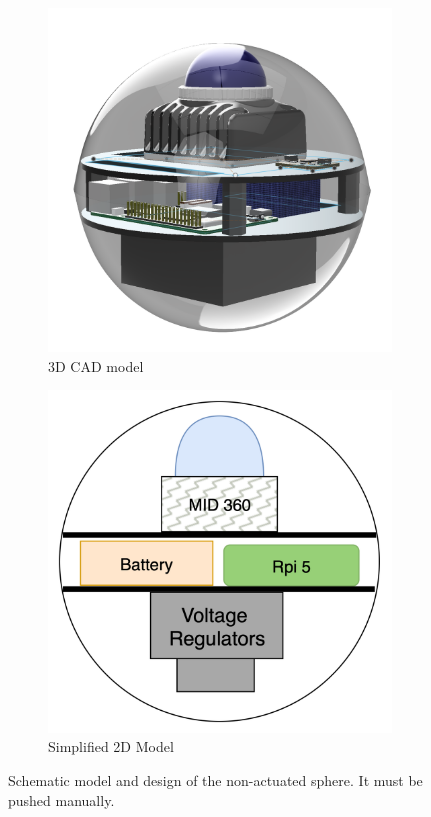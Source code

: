 \documentclass[english, bachelor, utf8]{base/thesis_telematics}
\begin{document}
\begin{figure}
\centering
\begin{subfigure}{0.4\columnwidth}
    \centering
    \includegraphics[width=\textwidth]{pics/Non_actuated_Sphere_CAD.png}
    \caption{3D CAD model}
    \label{fig:cad-model}
\end{subfigure}
\hfill
\begin{subfigure}{0.4\columnwidth}
    \centering
    \includegraphics[width=\textwidth]{pics/image.png}
    \caption{Simplified 2D Model}
    \label{fig:2d-model}
\end{subfigure}
\caption{Schematic model and design of the non-actuated sphere.
It must be pushed manually.}
\label{fig:cad-design1}
\end{figure}
\end{document}
